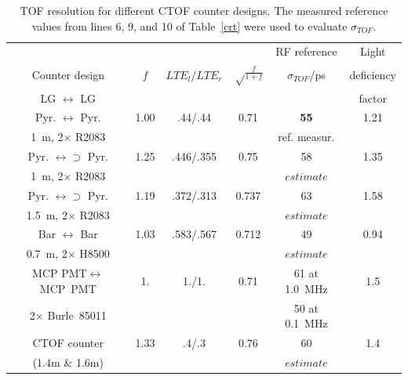 \begin{table}[htbp]
\begin{center}
\begin{tabular}{|c|c|c|c|c|c|} \hline
                        &     &               &                      & RF reference      & Light  \\ 
Counter design          & $f$ & $LTE_l/LTE_r$ & $\sqrt\frac{f}{1+f}$ & $\sigma_{TOF}$/ps & deficiency  \\ 
LG $\leftrightarrow$ LG &     &               &                      &                   & factor  \\ \hline
Pyr. $\leftrightarrow$ Pyr. & 1.00 & .44/.44  & 0.71 & \textbf{55}   & 1.21   \\
1~m, 2$\times$ R2083    &     &               &      &  ref. measur. &         \\ \hline
Pyr. $\leftrightarrow \supset$ Pyr.& 1.25     & .446/.355   & 0.75 & 58 &  1.35      \\
1~m, 2$\times$ R2083    &      &     &     &  $estimate$  &           \\ \hline
Pyr. $\leftrightarrow \supset$ Pyr.& 1.19  & .372/.313   & 0.737 & 63 &  1.58      \\
1.5~m, 2$\times$ R2083  &      &     &     &    $estimate$    &           \\ \hline
Bar $\leftrightarrow $ Bar & 1.03 & .583/.567 & 0.712 & 49  & 0.94         \\
0.7~m, 2$\times$ H8500  &      &     &     &   $estimate$   &           \\ \hline
MCP PMT$\leftrightarrow $MCP~PMT & 1. & 1./1. & 0.71& 61 at 1.0~MHz & 1.5 \\
2$\times$ Burle~85011   &      &     &     & 50 at 0.1~MHz  &           \\ \hline
CTOF counter       & 1.33   & .4/.3& 0.76 & 60    & 1.4     \\
(1.4m \& 1.6m)     &       &      &      &    $estimate$     &       \\ \hline
\end{tabular}    
\caption{\small{TOF resolution for different CTOF counter designs.  The 
measured reference values from lines 6, 9, and 10 of Table~\ref{crt} were 
used to evaluate $\sigma_{TOF}$.}}
\label{table4}
\end{center}
\end{table}

